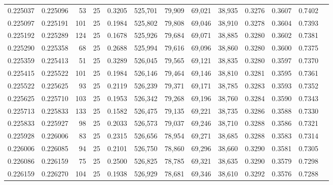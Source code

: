 \begin{tabular}{rrrrrrrrrrrrr}
0.225037 & 0.225096 &    53 &  25 &                                     0.3205 & 525,701 &  79,909 &  69,021 &  38,935 & 0.3276 & 0.3607 & 0.7402 \\
0.225097 & 0.225191 &   101 &  25 &                                     0.1984 & 525,802 &  79,808 &  69,046 &  38,910 & 0.3278 & 0.3604 & 0.7393 \\
0.225192 & 0.225289 &   124 &  25 &                                     0.1678 & 525,926 &  79,684 &  69,071 &  38,885 & 0.3280 & 0.3602 & 0.7381 \\
0.225290 & 0.225358 &    68 &  25 &                                     0.2688 & 525,994 &  79,616 &  69,096 &  38,860 & 0.3280 & 0.3600 & 0.7375 \\
0.225359 & 0.225413 &    51 &  25 &                                     0.3289 & 526,045 &  79,565 &  69,121 &  38,835 & 0.3280 & 0.3597 & 0.7370 \\
0.225415 & 0.225522 &   101 &  25 &                                     0.1984 & 526,146 &  79,464 &  69,146 &  38,810 & 0.3281 & 0.3595 & 0.7361 \\
0.225522 & 0.225625 &    93 &  25 &                                     0.2119 & 526,239 &  79,371 &  69,171 &  38,785 & 0.3283 & 0.3593 & 0.7352 \\
0.225625 & 0.225710 &   103 &  25 &                                     0.1953 & 526,342 &  79,268 &  69,196 &  38,760 & 0.3284 & 0.3590 & 0.7343 \\
0.225713 & 0.225833 &   133 &  25 &                                     0.1582 & 526,475 &  79,135 &  69,221 &  38,735 & 0.3286 & 0.3588 & 0.7330 \\
0.225833 & 0.225927 &    98 &  25 &                                     0.2033 & 526,573 &  79,037 &  69,246 &  38,710 & 0.3288 & 0.3586 & 0.7321 \\
0.225928 & 0.226006 &    83 &  25 &                                     0.2315 & 526,656 &  78,954 &  69,271 &  38,685 & 0.3288 & 0.3583 & 0.7314 \\
0.226006 & 0.226085 &    94 &  25 &                                     0.2101 & 526,750 &  78,860 &  69,296 &  38,660 & 0.3290 & 0.3581 & 0.7305 \\
0.226086 & 0.226159 &    75 &  25 &                                     0.2500 & 526,825 &  78,785 &  69,321 &  38,635 & 0.3290 & 0.3579 & 0.7298 \\
0.226159 & 0.226270 &   104 &  25 &                                     0.1938 & 526,929 &  78,681 &  69,346 &  38,610 & 0.3292 & 0.3576 & 0.7288 \\

\end{tabular}
